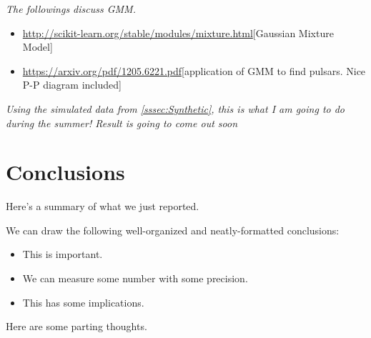 \documentclass[\docopts]{\docclass}
\begin{document}
\textit{The followings discuss GMM.}

\begin{itemize}

\item \url{http://scikit-learn.org/stable/modules/mixture.html}[Gaussian Mixture Model]
\item \url{https://arxiv.org/pdf/1205.6221.pdf}[application of GMM to find pulsars. Nice P-P diagram included]
\end{itemize}



\textit{Using the simulated data from \ref{sssec:Synthetic}, this is what I am going to do during the summer! Result is going to come out soon }


\section{Conclusions}
\label{sec:conclusions}

Here's a summary of what we just reported.

We can draw the following well-organized and neatly-formatted conclusions:
\begin{itemize}
  \item This is important.
  \item We can measure some number with some precision.
  \item This has some implications.
\end{itemize}

Here are some parting thoughts.
\end{document}
